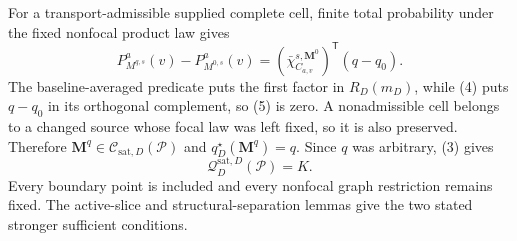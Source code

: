 For a transport-admissible supplied complete cell, finite total probability under the fixed nonfocal product law gives
\[
P_{M^{q,s}}^a(v)-P_{M^{0,s}}^a(v)
=(\bar\chi_{C_{a,v}}^{s,\mathbf M^0})^{\mathsf T}(q-q_0).
\tag{5}
\]
The baseline-averaged predicate puts the first factor in \(R_D(m_D)\), while (4) puts \(q-q_0\) in its orthogonal complement, so (5) is zero.  A nonadmissible cell belongs to a changed source whose focal law was left fixed, so it is also preserved.  Therefore \(\mathbf M^q\in\mathcal C_{\mathrm{sat},D}(\mathcal P)\) and \(q_D^\star(\mathbf M^q)=q\).  Since \(q\) was arbitrary, (3) gives
\[
\mathcal Q_D^{\mathrm{sat},D}(\mathcal P)=K.
\]
Every boundary point is included and every nonfocal graph restriction remains fixed.  The active-slice and structural-separation lemmas give the two stated stronger sufficient conditions.